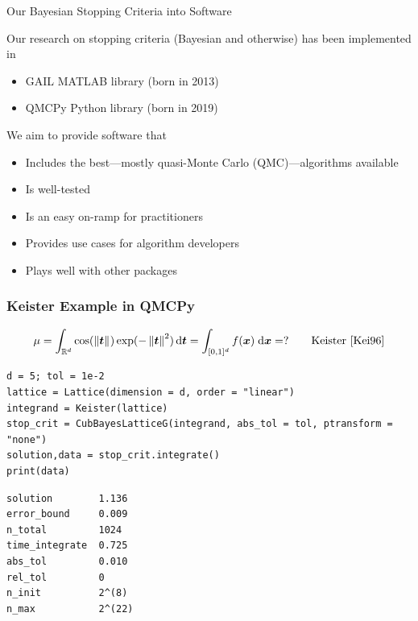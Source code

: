 \documentclass[11pt,compress,xcolor={usenames,dvipsnames},aspectratio=169]{beamer}
\begin{document}
\begin{frame}{Our Bayesian Stopping Criteria into Software}
	
	\vspace{-3ex}
	
	Our research on stopping criteria (Bayesian and otherwise) has been implemented in
	\begin{itemize}
		\item GAIL \cite{ChoEtal21a} MATLAB library (born in 2013)
		\item QMCPy \cite{QMCPy2020a} Python library (born in 2019)
	\end{itemize}
We aim to provide software that 
\begin{itemize}
	\item Includes the best---mostly quasi-Monte Carlo (QMC)---algorithms available
	\item Is well-tested
	\item Is an easy on-ramp for practitioners
	\item Provides use cases for algorithm developers 
	\item Plays well with other packages
\end{itemize}
	
	
\end{frame}
	

\begin{frame}[fragile]\frametitle{Keister Example in QMCPy \href{https://colab.research.google.com/drive/1KrlrtLu7j8Ff7YsSJjPMiGUr-UKfqwxm?usp=sharing}{}}
	\vspace{-5ex}
	\[
	\mu = \int_{\mathbb{R}^d} \cos(\left \lVert \boldsymbol{t} \right \rVert_{{}}) \exp(-\left \lVert \boldsymbol{t} \right \rVert_{{}}^2) \, {\rm d} \boldsymbol{t} = \int_{[0,1]^d} f(\boldsymbol{x}) \; {\rm d} \boldsymbol{x} =  ? \qquad \text{Keister \cite{Kei96}}
	\]
\noindent\begin{minipage}{0.47\textwidth}
\begin{lstlisting}[style=Python]
d = 5; tol = 1e-2
lattice = Lattice(dimension = d, order = "linear")
integrand = Keister(lattice)
stop_crit = CubBayesLatticeG(integrand, abs_tol = tol, ptransform = "none")
solution,data = stop_crit.integrate()
print(data)
\end{lstlisting}
\end{minipage} 
\qquad
\begin{minipage}{0.47\textwidth}
\begin{lstlisting}[style=Python]
solution        1.136
error_bound     0.009
n_total         1024
time_integrate  0.725
abs_tol         0.010
rel_tol         0
n_init          2^(8)
n_max           2^(22)
\end{lstlisting}
\end{minipage} 

\end{frame}
\end{document}
